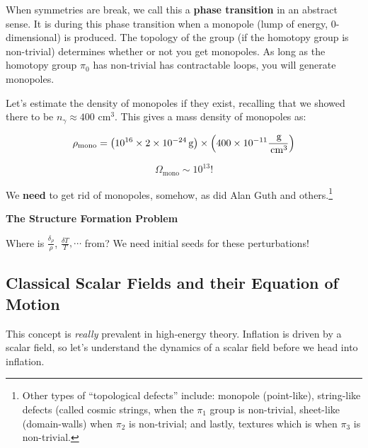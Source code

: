 \documentclass{article}
\newcommand{\unit}[1]{{\,\rm #1}}
\newcommand{\be}{\begin{equation}}
\newcommand{\ee}{\end{equation}}
\begin{document}
When symmetries are break, we call this a \textbf{phase transition} in an abstract sense. It is during this phase transition when a monopole (lump of energy, 0-dimensional) is produced. The topology of the group (if the homotopy group is non-trivial) determines whether or not you get monopoles. As long as the homotopy group $\pi_0$ has non-trivial has contractable loops, you will generate monopoles. 

Let's estimate the density of monopoles if they exist, recalling that we showed there to  be $n_\gamma \approx 400 \text{ cm}^3$. This gives a mass density of monopoles as:

\be
\rho_\text{mono} = \left(10^{16} \times 2 \times 10^{-24} \unit{ g}\right) \times \left(400 \times 10^{-11} \frac{\unit{g}}{\unit{cm}^3}\right)
\ee

\be
\Omega_\text{mono} \sim 10^{13}!
\ee

We \textbf{need} to get rid of monopoles, somehow, as did Alan Guth and others.\footnote{Other types of ``topological defects'' include: monopole (point-like), string-like defects (called cosmic strings, when the $\pi_1$ group is non-trivial, sheet-like (domain-walls) when $\pi_2$ is non-trivial; and lastly, textures which is when $\pi_3$ is non-trivial. } 


\noindent\textbf{The Structure Formation Problem}

Where is $\frac{\delta_\rho}{\rho}$, $\frac{\delta T}{T}, \cdots$ from? We need initial seeds for these perturbations!

\subsection{Classical Scalar Fields and their Equation of Motion}

This concept is \textit{really} prevalent in high-energy theory. Inflation is driven by a scalar field, so let's understand the dynamics of a scalar field before we head into inflation. 
\end{document}
